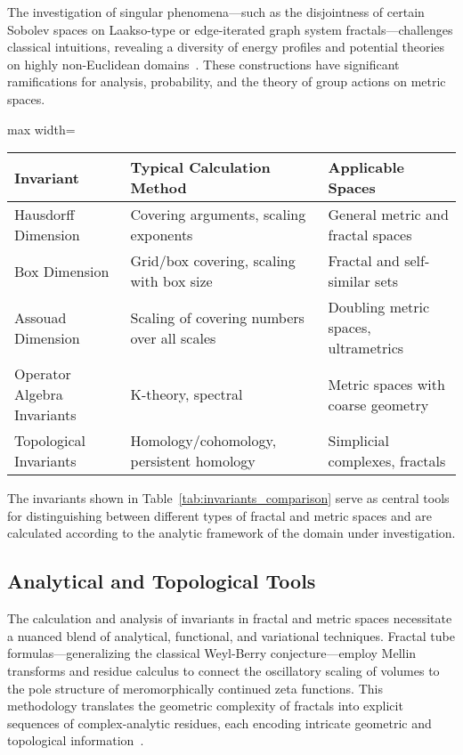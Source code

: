 \documentclass[sigconf]{acmart}
\begin{document}
The investigation of singular phenomena—such as the disjointness of certain Sobolev spaces on Laakso-type or edge-iterated graph system fractals—challenges classical intuitions, revealing a diversity of energy profiles and potential theories on highly non-Euclidean domains~\cite{ref30,ref35}. These constructions have significant ramifications for analysis, probability, and the theory of group actions on metric spaces.

\begin{table*}[htbp]
\centering
\caption{Key Invariants Across Metric Spaces and Their Calculation Methods}
\label{tab:invariants_comparison}
\begin{adjustbox}{max width=\textwidth}
\begin{tabular}{lll}
\toprule
\textbf{Invariant} & \textbf{Typical Calculation Method} & \textbf{Applicable Spaces} \\
\midrule
Hausdorff Dimension & Covering arguments, scaling exponents & General metric and fractal spaces \\
Box Dimension & Grid/box covering, scaling with box size & Fractal and self-similar sets \\
Assouad Dimension & Scaling of covering numbers over all scales & Doubling metric spaces, ultrametrics \\
Operator Algebra Invariants & K-theory, spectral & Metric spaces with coarse geometry \\
Topological Invariants & Homology/cohomology, persistent homology & Simplicial complexes, fractals \\
\bottomrule
\end{tabular}
\end{adjustbox}
\end{table*}

The invariants shown in Table~\ref{tab:invariants_comparison} serve as central tools for distinguishing between different types of fractal and metric spaces and are calculated according to the analytic framework of the domain under investigation.

\subsection{Analytical and Topological Tools}

The calculation and analysis of invariants in fractal and metric spaces necessitate a nuanced blend of analytical, functional, and variational techniques. Fractal tube formulas—generalizing the classical Weyl-Berry conjecture—employ Mellin transforms and residue calculus to connect the oscillatory scaling of volumes to the pole structure of meromorphically continued zeta functions. This methodology translates the geometric complexity of fractals into explicit sequences of complex-analytic residues, each encoding intricate geometric and topological information~\cite{ref21,ref33}.
\end{document}
